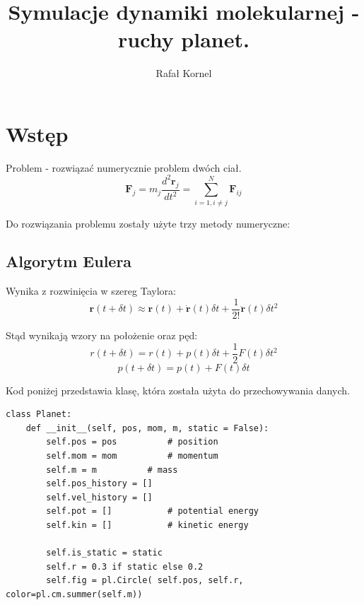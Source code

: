 \documentclass[10pt,a4paper]{article}
\author{Rafał Kornel}
\title{\textbf{Symulacje dynamiki molekularnej - ruchy planet.}}
\date{}
\begin{document}
\maketitle




\section*{Wstęp}
	Problem - rozwiązać numerycznie problem dwóch ciał.
	\begin{equation} \textbf{F}_{j} = m_{j} \frac{d^{2}\textbf{r}_{j}}{dt^2} = \sum_{i = 1, i \neq j}^{N} \textbf{F}_{ij} \end{equation}
	
	Do rozwiązania problemu zostały użyte trzy metody numeryczne:
	
\subsection*{Algorytm Eulera}
	Wynika z rozwinięcia w szereg Taylora:
	\begin{equation} \textbf{r}(t+\delta t) \approx \textbf{r}(t) + \dot{\textbf{r}}(t) \delta t +\frac{1}{2!} \ddot{\textbf{r}}(t) \delta t^2	\end{equation}
	
	Stąd wynikają wzory na położenie oraz pęd:
	$$ r(t + \delta t) = r(t) + p(t) \delta t + \frac{1}{2} F(t) \delta t^2 $$
	$$ p(t + \delta t) = p(t) + F(t) \delta t $$
	
	Kod poniżej przedstawia klasę, która została użyta do przechowywania danych.	
	
\lstset{language=Python}
\lstset{basicstyle=\footnotesize}

\begin{lstlisting}
class Planet:
    def __init__(self, pos, mom, m, static = False):
        self.pos = pos			# position
        self.mom = mom			# momentum
        self.m = m			# mass
        self.pos_history = []
        self.vel_history = []
        self.pot = []			# potential energy
        self.kin = []			# kinetic energy
        
        self.is_static = static
        self.r = 0.3 if static else 0.2
        self.fig = pl.Circle( self.pos, self.r, color=pl.cm.summer(self.m))
   
\end{lstlisting}
\end{document}
